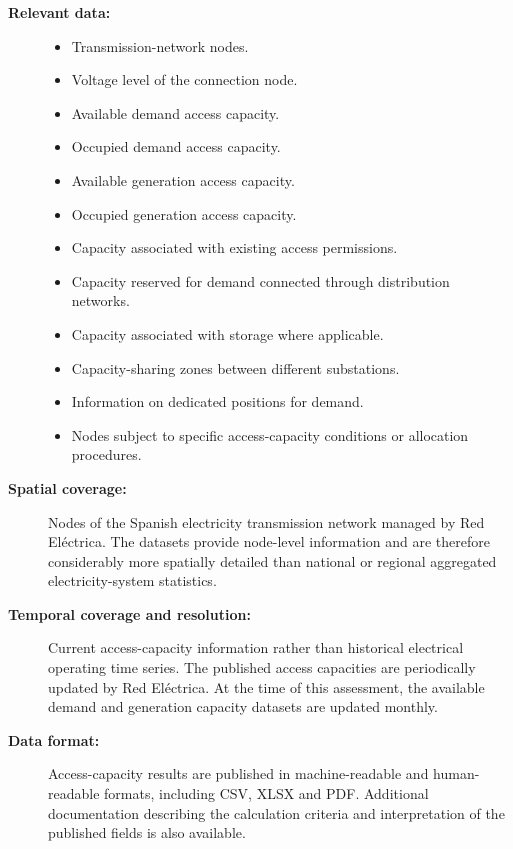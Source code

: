 \begin{description}
    \item[\textbf{Relevant data:}] \hfill
    \begin{itemize}
        \item Transmission-network nodes.
        \item Voltage level of the connection node.
        \item Available demand access capacity.
        \item Occupied demand access capacity.
        \item Available generation access capacity.
        \item Occupied generation access capacity.
        \item Capacity associated with existing access permissions.
        \item Capacity reserved for demand connected through distribution
        networks.
        \item Capacity associated with storage where applicable.
        \item Capacity-sharing zones between different substations.
        \item Information on dedicated positions for demand.
        \item Nodes subject to specific access-capacity conditions or
        allocation procedures.
    \end{itemize}

    \item[\textbf{Spatial coverage:}]
    Nodes of the Spanish electricity transmission network managed by
    Red Eléctrica. The datasets provide node-level information and are
    therefore considerably more spatially detailed than national or
    regional aggregated electricity-system statistics.

    \item[\textbf{Temporal coverage and resolution:}]
    Current access-capacity information rather than historical electrical
    operating time series. The published access capacities are periodically
    updated by Red Eléctrica. At the time of this assessment, the available
    demand and generation capacity datasets are updated monthly.

    \item[\textbf{Data format:}]
    Access-capacity results are published in machine-readable and
    human-readable formats, including CSV, XLSX and PDF. Additional
    documentation describing the calculation criteria and interpretation
    of the published fields is also available.


\end{description}
